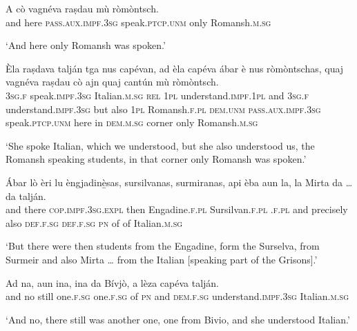 \begin{linenumbers}
\gll    A cò vagnéva raṣdau mù ròmòntsch.\\
and here \textsc{pass.aux.impf.3sg} speak.\textsc{ptcp.unm} only Romansh.\textsc{m.sg}\\
\end{linenumbers}
\medskip
\glt `And here only Romansh was spoken.'
\medskip

\begin{linenumbers}
\gll    Èla raṣdava talján tga nus capévan, ad èla capéva ábar è nus ròmòntschas, quaj vagnéva raṣdau cò ajn quaj cantún mù ròmòntsch.\\
 \textsc{3sg.f} speak.\textsc{impf.3sg} Italian.\textsc{m.sg} \textsc{rel} \textsc{1pl} understand.\textsc{impf.1pl} and \textsc{3sg.f} understand.\textsc{impf.3sg} but also \textsc{1pl} Romansh.\textsc{f.pl} \textsc{dem.unm} \textsc{pass.aux.impf.3sg} speak.\textsc{ptcp.unm} here in  \textsc{dem.m.sg} corner only Romansh.\textsc{m.sg}\\
\end{linenumbers}
\medskip
\glt `She spoke Italian, which we understood, but she also understood us, the Romansh speaking students, in that corner only Romansh was spoken.'
\medskip

\begin{linenumbers}
\gll    Ábar lò èri lu  èngjadinè̱sas, sursilvanas, surmiranas, api èba aun la, la Mirta da … da talján.\\
and there \textsc{cop.impf.3sg.expl} then Engadine.\textsc{f.pl} Sursilvan.\textsc{f.pl} .\textsc{f.pl} and precisely also \textsc{def.f.sg} \textsc{def.f.sg} \textsc{pn} of {} of Italian.\textsc{m.sg}\\
\end{linenumbers}
\medskip
\glt `But there were then students from the Engadine, form the Surselva, from Surmeir and also Mirta … from the Italian [speaking part of the Grisons].'
\medskip

\begin{linenumbers}
\gll    Ad na, aun ina, ina da Bívjò, a lèza capéva talján.\\
and no still one.\textsc{f.sg} one.\textsc{f.sg} of \textsc{pn} and \textsc{dem.f.sg} understand.\textsc{impf.3sg} Italian.\textsc{m.sg}\\
\end{linenumbers}
\medskip
\glt `And no, there still was another one, one from Bivio, and she understood Italian.'
\medskip


